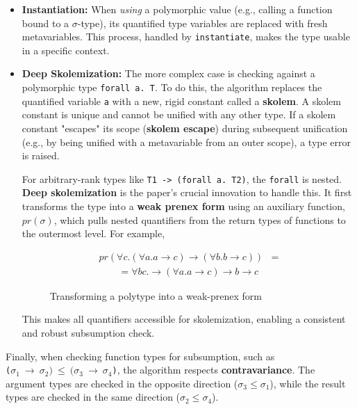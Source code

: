 \begin{itemize}
    \item \textbf{Instantiation:} When \textit{using} a polymorphic value (e.g., calling a function bound to a $\sigma$-type), its quantified type variables are replaced with fresh metavariables. This process, handled by \texttt{instantiate}, makes the type usable in a specific context.

    \item \textbf{Deep Skolemization:} The more complex case is checking against a polymorphic type \texttt{forall a. T}. To do this, the algorithm replaces the quantified variable \texttt{a} with a new, rigid constant called a \textbf{skolem}. A skolem constant is unique and cannot be unified with any other type. If a skolem constant "escapes" its scope (\textbf{skolem escape}) during subsequent unification (e.g., by being unified with a metavariable from an outer scope), a type error is raised.

          For arbitrary-rank types like \texttt{T1 -> (forall a. T2)}, the \texttt{forall} is nested. \textbf{Deep skolemization} is the paper's crucial innovation to handle this. It first transforms the type into a \textbf{weak prenex form} using an auxiliary function, $pr(\sigma)$, which pulls nested quantifiers from the return types of functions to the outermost level. For example,

          \begin{figure}
          \begin{equation*}
              \begin{split}
                  pr(\forall c. (\forall a. a \rightarrow c) \rightarrow (\forall b. b \rightarrow c)) & = \\
                  \quad \quad =\forall b c. \rightarrow (\forall a. a \rightarrow c) \rightarrow b \rightarrow c
              \end{split}
          \end{equation*}
          \caption{Transforming a polytype into a weak-prenex form}
        \end{figure}

          This makes all quantifiers accessible for skolemization, enabling a consistent and robust subsumption check.
\end{itemize}

Finally, when checking function types for subsumption, such as \\ \texttt{($\sigma_1~\rightarrow~\sigma_2)~\leq~(\sigma_3~\rightarrow~\sigma_4$)}, the algorithm respects \textbf{contravariance}. The argument types are checked in the opposite direction ($\sigma_3 \leq \sigma_1$), while the result types are checked in the same direction ($\sigma_2 \leq \sigma_4$).

